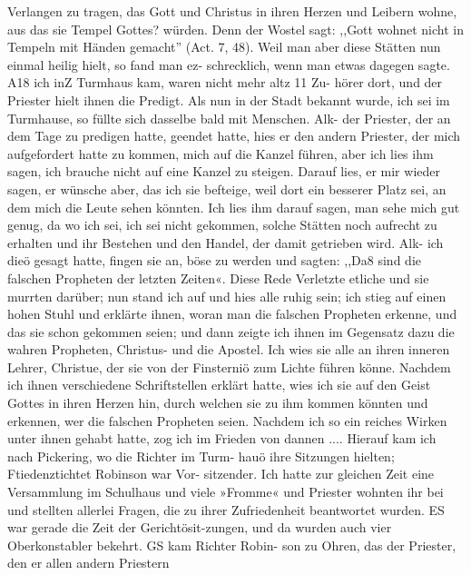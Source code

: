 Verlangen zu tragen, das Gott und Christus in ihren Herzen
und Leibern wohne, aus das sie Tempel Gottes? würden. Denn
der Wostel sagt: ,,Gott wohnet nicht in Tempeln mit Händen
gemacht'' (Act. 7, 48). Weil man aber diese Stätten nun einmal
heilig hielt, so fand man ez- schrecklich, wenn man etwas dagegen
sagte. A18 ich inZ Turmhaus kam, waren nicht mehr altz 11 Zu-
hörer dort, und der Priester hielt ihnen die Predigt. Als nun
in der Stadt bekannt wurde, ich sei im Turmhause, so füllte sich
dasselbe bald mit Menschen. Alk- der Priester, der an dem Tage
zu predigen hatte, geendet hatte, hies er den andern Priester, der
mich aufgefordert hatte zu kommen, mich auf die Kanzel führen,
aber ich lies ihm sagen, ich brauche nicht auf eine Kanzel zu
steigen. Darauf lies, er mir wieder sagen, er wünsche aber, das
ich sie befteige, weil dort ein besserer Platz sei, an dem mich die
Leute sehen könnten. Ich lies ihm darauf sagen, man sehe mich
gut genug, da wo ich sei, ich sei nicht gekommen, solche Stätten
noch aufrecht zu erhalten und ihr Bestehen und den Handel, der
damit getrieben wird. Alk- ich dieö gesagt hatte, fingen sie an,
böse zu werden und sagten: ,,Da8 sind die falschen Propheten
der letzten Zeiten«. Diese Rede Verletzte etliche und sie murrten
darüber; nun stand ich auf und hies alle ruhig sein; ich stieg
auf einen hohen Stuhl und erklärte ihnen, woran man die falschen
Propheten erkenne, und das sie schon gekommen seien; und dann
zeigte ich ihnen im Gegensatz dazu die wahren Propheten, Christus-
und die Apostel. Ich wies sie alle an ihren inneren Lehrer,
Christue, der sie von der Finsterniö zum Lichte führen könne.
Nachdem ich ihnen verschiedene Schriftstellen erklärt hatte, wies
ich sie auf den Geist Gottes in ihren Herzen hin, durch welchen
sie zu ihm kommen könnten und erkennen, wer die falschen
Propheten seien. Nachdem ich so ein reiches Wirken unter ihnen
gehabt hatte, zog ich im Frieden von dannen ....
Hierauf kam ich nach Pickering, wo die Richter im Turm-
hauö ihre Sitzungen hielten; Ftiedenztichtet Robinson war Vor-
sitzender. Ich hatte zur gleichen Zeit eine Versammlung im
Schulhaus und viele »Fromme« und Priester wohnten ihr bei
und stellten allerlei Fragen, die zu ihrer Zufriedenheit beantwortet
wurden. ES war gerade die Zeit der Gerichtösit-zungen, und da
wurden auch vier Oberkonstabler bekehrt. GS kam Richter Robin-
son zu Ohren, das der Priester, den er allen andern Priestern


